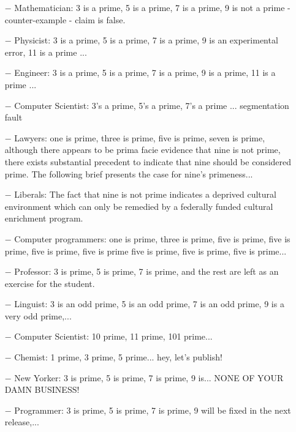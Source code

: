 \begin{itemize}	 
	\item[$-$] Mathematician: 3 is a prime, 5 is a prime, 7 is a prime, 9 is not a prime - counter-example - claim is false.

	\item[$-$] Physicist: 3 is a prime, 5 is a prime, 7 is a prime, 9 is an experimental error, 11 is a prime ...

	\item[$-$] Engineer: 3 is a prime, 5 is a prime, 7 is a prime, 9 is a prime, 11 is a prime ...

	\item[$-$] Computer Scientist: 3's a prime, 5's a prime, 7's a prime ... segmentation fault

	\item[$-$] Lawyers: one is prime, three is prime, five is prime, seven is prime, although there appears to be prima facie evidence that nine is not prime, there exists substantial precedent to indicate that nine should be considered prime. The following brief presents the case for nine's primeness...

	\item[$-$] Liberals: The fact that nine is not prime indicates a deprived cultural environment which can only be remedied by a federally funded cultural enrichment program.

	\item[$-$] Computer programmers: one is prime, three is prime, five is prime, five is prime, five is prime, five is prime five is prime, five is prime, five is prime...

	\item[$-$] Professor: 3 is prime, 5 is prime, 7 is prime, and the rest are left as an exercise for the student.

	\item[$-$] Linguist: 3 is an odd prime, 5 is an odd prime, 7 is an odd prime, 9 is a very odd prime,...

	\item[$-$] Computer Scientist: 10 prime, 11 prime, 101 prime...

	\item[$-$] Chemist: 1 prime, 3 prime, 5 prime... hey, let's publish!

	\item[$-$] New Yorker: 3 is prime, 5 is prime, 7 is prime, 9 is... NONE OF YOUR DAMN BUSINESS!

	\item[$-$] Programmer: 3 is prime, 5 is prime, 7 is prime, 9 will be fixed in the next release,...


\end{itemize}
